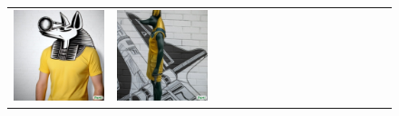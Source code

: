\begin{figure}
\begin{adjustwidth}{-0.8in}{-0.5in}
\begin{tabular}{cccccccccccccccccccc}
\multicolumn{3}{c}{\includegraphics[width=\twobytwocolwidth\textwidth]{figures/limitations/yellow_anubis3.jpg}} &
\multicolumn{3}{c}{\includegraphics[width=\twobytwocolwidth\textwidth]{figures/limitations/yellow_anubis4.jpg}} &&

\end{tabular}
\end{adjustwidth}
\end{figure}
